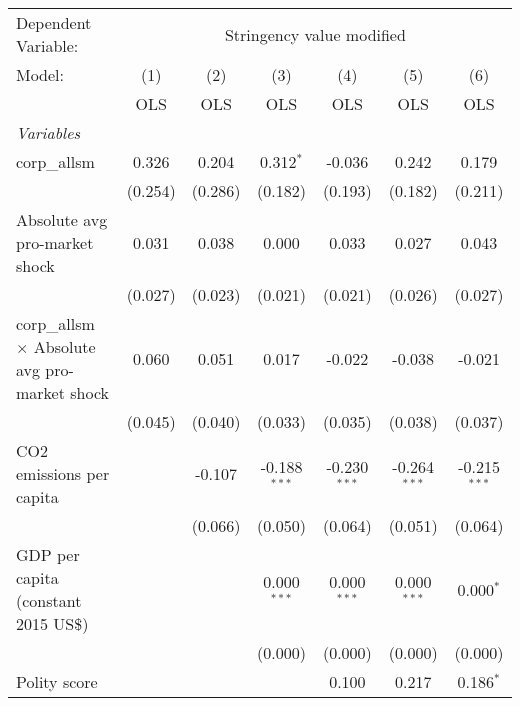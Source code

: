 
\begingroup
\centering
\begin{tabular}{lcccccc}
   \toprule
   Dependent Variable: & \multicolumn{6}{c}{Stringency value modified}\\
   Model:                                               & (1)     & (2)     & (3)            & (4)            & (5)            & (6)\\  
                                                        &  OLS    & OLS     & OLS            & OLS            & OLS            & OLS\\  
   \midrule
   \emph{Variables}\\
   corp\_allsm                                          & 0.326   & 0.204   & 0.312$^{*}$    & -0.036         & 0.242          & 0.179\\   
                                                        & (0.254) & (0.286) & (0.182)        & (0.193)        & (0.182)        & (0.211)\\   
   Absolute avg pro-market shock                        & 0.031   & 0.038   & 0.000          & 0.033          & 0.027          & 0.043\\   
                                                        & (0.027) & (0.023) & (0.021)        & (0.021)        & (0.026)        & (0.027)\\   
   corp\_allsm $\times$ Absolute avg pro-market shock   & 0.060   & 0.051   & 0.017          & -0.022         & -0.038         & -0.021\\   
                                                        & (0.045) & (0.040) & (0.033)        & (0.035)        & (0.038)        & (0.037)\\   
   CO2 emissions per capita                             &         & -0.107  & -0.188$^{***}$ & -0.230$^{***}$ & -0.264$^{***}$ & -0.215$^{***}$\\   
                                                        &         & (0.066) & (0.050)        & (0.064)        & (0.051)        & (0.064)\\   
   GDP per capita (constant 2015 US\$)                  &         &         & 0.000$^{***}$  & 0.000$^{***}$  & 0.000$^{***}$  & 0.000$^{*}$\\   
                                                        &         &         & (0.000)        & (0.000)        & (0.000)        & (0.000)\\   
   Polity score                                         &         &         &                & 0.100          & 0.217          & 0.186$^{*}$\\   

\end{tabular}
